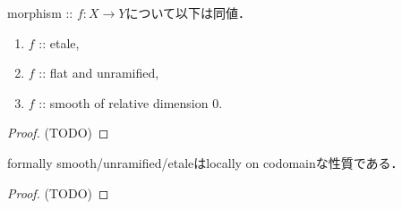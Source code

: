 \documentclass[a4paper]{jsarticle}
\begin{document}
\begin{Thm} \label{thm:etale_equiv}
    morphism :: $f \colon X \to Y$について以下は同値．
    \begin{enumerate}
        \item $f$ :: etale,
        \item $f$ :: flat and unramified, 
        \item $f$ :: smooth of relative dimension $0$.
    \end{enumerate}
\end{Thm}
\begin{proof}
    (TODO)
\end{proof}

\begin{Prop}
    formally smooth/unramified/etaleはlocally on codomainな性質である．
\end{Prop}
\begin{proof}
    (TODO)
\end{proof}
\end{document}
